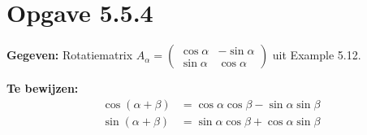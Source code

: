 \documentclass{article}
\begin{document}
\section*{Opgave 5.5.4}

\textbf{Gegeven:} Rotatiematrix $A_{\alpha} = \begin{pmatrix} \cos \alpha & -\sin \alpha \\ \sin \alpha & \cos \alpha \end{pmatrix}$ uit Example 5.12.

\textbf{Te bewijzen:}
\begin{align*}
    \cos(\alpha + \beta) & = \cos \alpha \cos \beta - \sin \alpha \sin \beta \\
    \sin(\alpha + \beta) & = \sin \alpha \cos \beta + \cos \alpha \sin \beta
\end{align*}
\end{document}
